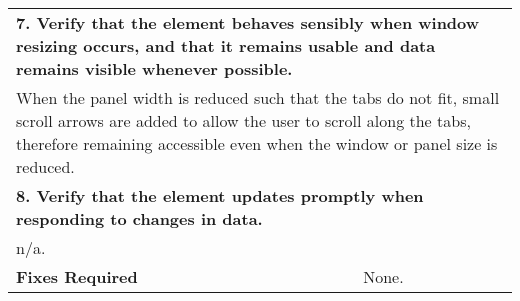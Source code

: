 \begin{longtable}{ l p{10cm} }
 \hline
 \multicolumn{2}{p{14cm}}{\textbf{7. Verify that the element behaves sensibly when window resizing occurs, and that it remains usable and data remains visible whenever possible.}}\\
 \multicolumn{2}{p{14cm}}{When the panel width is reduced such that the tabs do not fit, small scroll arrows are added to allow the user to scroll along the tabs, therefore remaining accessible even when the window or panel size is reduced.}\\
 \hline
 \multicolumn{2}{p{14cm}}{\textbf{8. Verify that the element updates promptly when responding to changes in data.}}\\
 \multicolumn{2}{p{14cm}}{n/a.}\\
 \hline
 \textbf{Fixes Required} & None.\\
 \bottomrule
\end{longtable}
\clearpage

